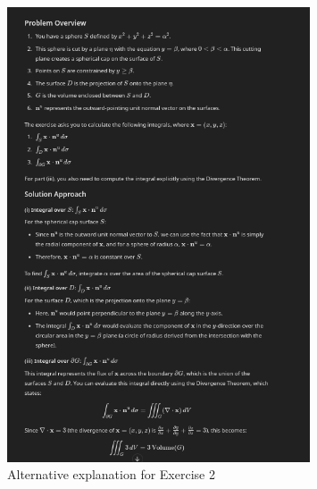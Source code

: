 \documentclass[a4paper]{report}
\begin{document}
\begin{figure}[H]
	\centering
	\includegraphics[width=0.8\textwidth]{assets/bord_7_ex_2_alt_explanation.png}
	\caption{Alternative explanation for Exercise 2}
	\label{fig:bord_7_ex_2_alt_explanation}
\end{figure}
\end{document}
